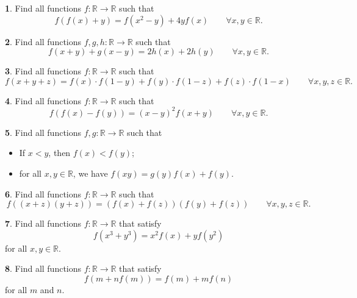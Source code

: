 \documentclass{article}
\theoremstyle{definition}
\newtheorem{p}{}
\begin{document}
\begin{p}
Find all functions $ f: \mathbb R \to \mathbb R$ such that 
\[f(f(x)+y)=f(x^{2}-y)+4yf(x) \qquad \forall x,y \in \mathbb R.\]
\end{p}



\begin{p}
Find all functions $f,g,h: \mathbb R \to \mathbb R$ such that
\[f(x+y)+g(x-y)=2h(x)+2h(y) \qquad \forall x,y \in \mathbb R.\]
\end{p}



\begin{p}
Find all functions $ f: \mathbb R \to \mathbb R$ such that
\[ f(x+y+z) = f(x)\cdot f(1-y)+f(y)\cdot f(1-z)+f(z)\cdot f(1-x) \qquad \forall x,y,z \in \mathbb R.\]
\end{p}


\begin{p}
Find all functions $ f: \mathbb R \to \mathbb R$ such that
\[f(f(x)-f(y)) = (x-y)^{2}f(x+y) \qquad \forall x,y \in \mathbb R.\]
\end{p}



\begin{p}
Find all functions $ f,g: \mathbb R \to \mathbb R$ such that
\begin{itemize}
\item If $ x < y$, then $ f(x) < f(y)$;
\item for all $ x,y \in \mathbb R$, we have $ f(xy) = g(y)f(x) + f(y)$.
\end{itemize}
\end{p}



\begin{p}
Find all functions $ f: \mathbb R \to \mathbb R$ such that
\[f((x+z)(y+z))=(f(x)+f(z))(f(y)+f(z))\qquad \forall x,y,z \in \mathbb R.\]
\end{p}



\begin{p}
Find all functions $ f : \mathbb{R}\to\mathbb{R}$ that satisfy
\[ f (x^{3} + y^{3}) = x^{2}f (x) + yf (y^{2})\]
for all $ x, y \in\mathbb R.$
\end{p}



\begin{p}
Find all functions $f: \mathbb{R} \to  \mathbb{R}$ that satisfy 
\[ f(m+nf(m))=f(m)+mf(n)\]
 for all $ m$ and $ n$.
\end{p}
\end{document}
